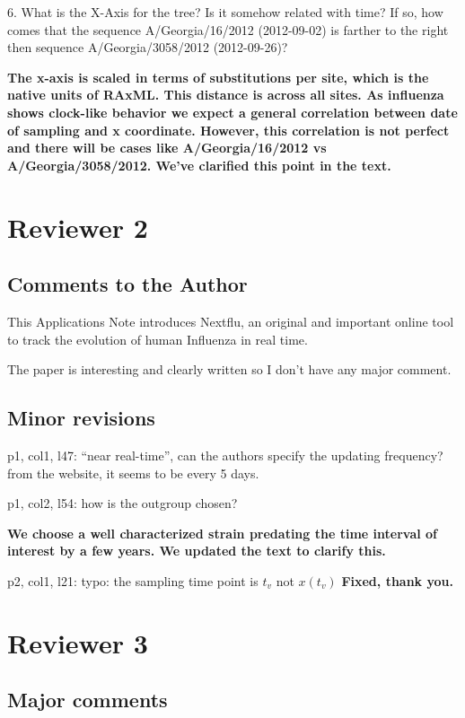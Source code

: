 \documentclass[11pt,oneside,letterpaper]{article}
\begin{document}
6. What is the X-Axis for the tree? Is it somehow related with time? If so, how comes that the sequence A/Georgia/16/2012 (2012-09-02) is farther to the right then sequence A/Georgia/3058/2012 (2012-09-26)?

\textbf{The x-axis is scaled in terms of substitutions per site, which is the native units of RAxML. This distance is across all sites. As influenza shows clock-like behavior we expect a general correlation between date of sampling and x coordinate. However, this correlation is not perfect and there will be cases like A/Georgia/16/2012 vs A/Georgia/3058/2012. We've clarified this point in the text.}

\section*{Reviewer 2}

\subsection*{Comments to the Author}

This Applications Note introduces Nextflu, an original and important online tool to track the evolution of human Influenza in real time.

The paper is interesting and clearly written so I don't have any major comment.

\subsection*{Minor revisions}

p1, col1, l47: ``near real-time'', can the authors specify the updating frequency? from the website, it seems to be every 5 days.

p1, col2, l54: how is the outgroup chosen?

{\bf We choose a well characterized strain predating the time interval of interest by a few years. We updated the text to clarify this.}

p2, col1, l21: typo: the sampling time point is $t_v$ not $x(t_v)$
{\bf Fixed, thank you.}

\section*{Reviewer 3}

\subsection*{Major comments}
\end{document}
